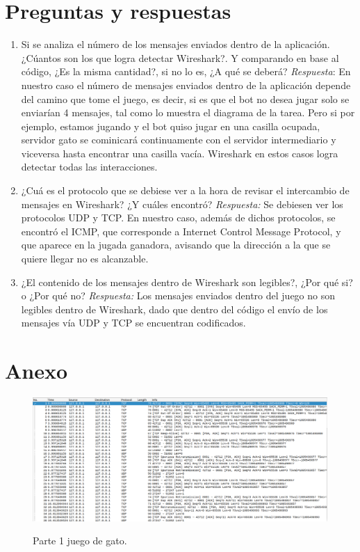 \documentclass[a4paper,11pt]{article}
\begin{document}
\section{Preguntas y respuestas}
\begin{enumerate}
    \item Si se analiza el n\'umero de los mensajes enviados dentro de la aplicaci\'on. ¿C\'uantos son los que logra detectar Wireshark?. Y comparando en base al c\'odigo, ¿Es la misma cantidad?, si no lo es, ¿A qu\'e se deber\'a?
    \newline \textit{Respuesta}: En nuestro caso el n\'umero de mensajes enviados dentro de la aplicaci\'on depende del camino que tome el juego, es decir, si es que el bot no desea jugar solo se enviar\'ian 4 mensajes, tal como lo muestra el diagrama de la tarea. Pero si por ejemplo, estamos jugando y el bot quiso jugar en una casilla ocupada, servidor gato se cominicar\'a continuamente con el servidor intermediario y viceversa hasta encontrar una casilla vac\'ia.
    Wireshark en estos casos logra detectar todas las interacciones.
    
    \item ¿Cu\'a es el protocolo que se debiese ver a la hora de revisar el intercambio de mensajes en Wireshark? ¿Y cu\'ales encontr\'o?
    \newline \textit{Respuesta:} Se debiesen ver los protocolos UDP y TCP. En nuestro caso, además de dichos protocolos, se encontró el ICMP, que corresponde a Internet Control Message Protocol, y que aparece en la jugada ganadora, avisando que la dirección a la que se quiere llegar no es alcanzable.
    
    \item ¿El contenido de los mensajes dentro de Wireshark son legibles?, ¿Por qu\'e si? o  ¿Por qu\'e no?
    \newline \textit{Respuesta:} Los mensajes enviados dentro del juego no son legibles dentro de Wireshark, dado que dentro del código el envío de los mensajes vía UDP y TCP se encuentran codificados.
\end{enumerate}
 \newpage
\section{Anexo}

\begin{figure}[h]
    \centering
    {\includegraphics[width = 1.0\textwidth]{imagen-1.png}}
    \caption {Parte 1 juego de gato.}
\end{figure}
\end{document}
